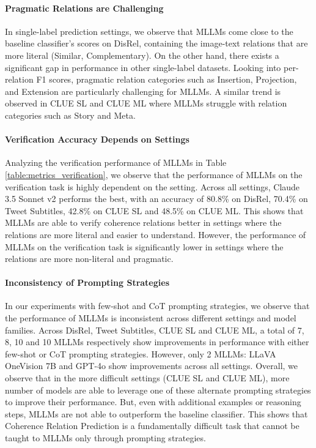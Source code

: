 \paragraph{Pragmatic Relations are Challenging}
In single-label prediction settings, we observe that MLLMs come close to the baseline classifier's scores on DisRel, containing the image-text relations that are more literal (Similar, Complementary). On the other hand, there exists a significant gap in performance in other single-label datasets. Looking into per-relation F1 scores, pragmatic relation categories such as Insertion, Projection, and Extension are particularly challenging for MLLMs. A similar trend is observed in CLUE SL and CLUE ML where MLLMs struggle with relation categories such as Story and Meta.


\paragraph{Verification Accuracy Depends on Settings}
Analyzing the verification performance of MLLMs in Table \ref{table:metrics_verification}, we observe that the performance of MLLMs on the verification task is highly dependent on the setting. Across all settings, Claude 3.5 Sonnet v2 performs the best, with an accuracy of 80.8\% on DisRel, 70.4\% on Tweet Subtitles, 42.8\% on CLUE SL and 48.5\% on CLUE ML. This shows that MLLMs are able to verify coherence relations better in settings where the relations are more literal and easier to understand. However, the performance of MLLMs on the verification task is significantly lower in settings where the relations are more non-literal and pragmatic. 

\paragraph{Inconsistency of Prompting Strategies}
In our experiments with few-shot and CoT prompting strategies, we observe that the performance of MLLMs is inconsistent across different settings and model families. Across DisRel, Tweet Subtitles, CLUE SL and CLUE ML, a total of 7, 8, 10 and 10 MLLMs respectively show improvements in performance with either few-shot or CoT prompting strategies. However, only 2 MLLMs: LLaVA OneVision 7B and GPT-4o show improvements across all settings. Overall, we observe that in the more difficult settings (CLUE SL and CLUE ML), more number of models are able to leverage one of these alternate prompting strategies to improve their performance. But, even with additional examples or reasoning steps, MLLMs are not able to outperform the baseline classifier. This shows that Coherence Relation Prediction is a fundamentally difficult task that cannot be taught to MLLMs only through prompting strategies.

